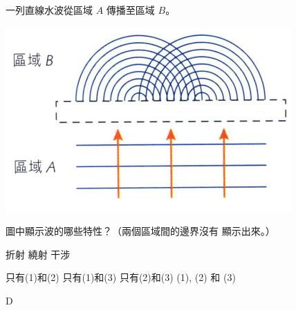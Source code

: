 {
    一列直線水波從區域 $A$ 傳播至區域 $B$。
    \par{\par\centering\includegraphics[width=.4\textwidth]{./img/ch3_earlyclass_wave_mc_2024-05-14-12-22-59.png}\par}
    圖中顯示波的哪些特性？（兩個區域間的邊界沒有 顯示出來。）
    \begin{statements}
        \task 折射
        \task 繞射
        \task 干涉
    \end{statements}
    \begin{tasks}
        \task 只有(1)和(2)
        \task 只有(1)和(3)
        \task 只有(2)和(3)
        \task (1), (2) 和 (3)
    \end{tasks}
}{\mckey D}

